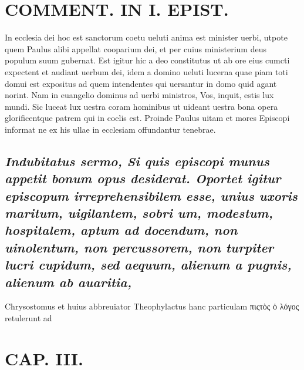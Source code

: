 \documentclass{article}
\begin{document}
\begin{pages}
\section*{COMMENT. IN I. EPIST. }\pstart In ecclesia dei hoc est sanctorum coetu ueluti anima est minister uerbi, utpote quem Paulus alibi appellat cooparium dei, et per cuius ministerium deus populum suum gubernat. Est igitur hic a deo constitutus ut ab ore eius cumcti expectent et audiant uerbum dei, idem a domino ueluti lucerna quae piam toti domui est expositus ad quem intendentes qui uersantur in domo quid agant norint. Nam in euangelio dominus ad uerbi ministros, Vos, inquit, estis lux mundi. Sic luceat lux uestra coram hominibus ut uideant uestra bona opera glorificentque patrem qui in coelis est. Proinde Paulus uitam et mores Episcopi informat ne ex his ullae in ecclesiam offundantur tenebrae.  \pend
{}
{}
\subsection*{\textit{Indubitatus sermo, Si quis episcopi munus appetit bonum opus desiderat. Oportet igitur episcopum irreprehensibilem esse, unius uxoris maritum, uigilantem, sobri um, modestum, hospitalem, aptum ad docendum, non uinolentum, non percussorem, non turpiter lucri cupidum, sed aequum, alienum a pugnis, alienum ab auaritia, }}\pstart Chrysostomus et huius abbreuiator Theophylactus hanc particulam πιςτὸς ὁ λόγος retulerunt ad  \pend
\endnumbering\beginnumbering\section{CAP. III.}\pstart   \pend
\endnumbering
\end{pages}
\end{document}
